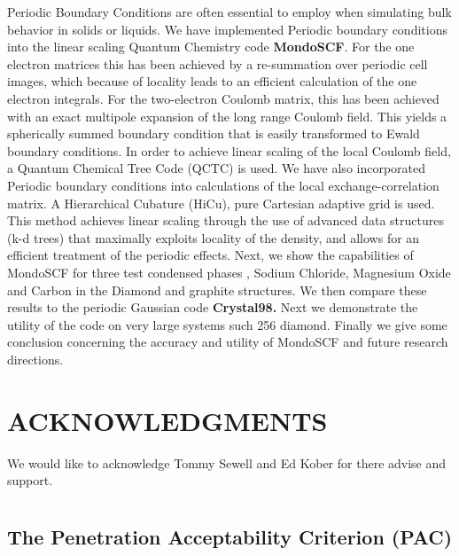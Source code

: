 \commentoutA{\documentclass[prb,aps,twocolumn,showpacs,twocolumngrid,superbib]{revtex4}}
\begin{document}
Periodic Boundary Conditions are often essential to employ when simulating
bulk behavior in solids or liquids. We have implemented Periodic boundary
conditions into the linear scaling Quantum Chemistry code \textbf{MondoSCF}.
For the one electron matrices this has been achieved by a re-summation
over periodic cell images, which because of locality leads to an efficient
calculation of the one electron integrals. For the two-electron Coulomb
matrix, this has been achieved with an exact multipole expansion of
the long range Coulomb field. This yields a spherically summed boundary
condition that is easily transformed to Ewald boundary conditions.
In order to achieve linear scaling of the local Coulomb field, a Quantum
Chemical Tree Code (QCTC) is used. We have also incorporated Periodic
boundary conditions into calculations of the local exchange-correlation
matrix. A Hierarchical Cubature (HiCu), pure Cartesian adaptive grid
is used. This method achieves linear scaling through the use of advanced
data structures (k-d trees) that maximally exploits locality of the
density, and allows for an efficient treatment of the periodic effects.
Next, we show the capabilities of MondoSCF for three test condensed
phases , Sodium Chloride, Magnesium Oxide and Carbon in the Diamond
and graphite structures. We then compare these results to the periodic
Gaussian code \textbf{Crystal98.} Next we demonstrate the utility
of the code on very large systems such 256 diamond. Finally we give
some conclusion concerning the accuracy and utility of MondoSCF and
future research directions.


\section*{ACKNOWLEDGMENTS}

We would like to acknowledge Tommy Sewell and Ed Kober for there advise
and support. 

\eject





\eject


\section*{}


\subsection*{The Penetration Acceptability Criterion (PAC)}
\end{document}
